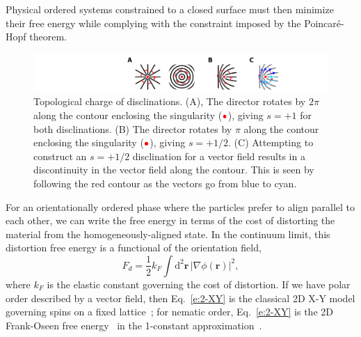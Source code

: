 Physical ordered systems constrained to a closed surface must then minimize their free energy while complying with the constraint imposed by the Poincar\'e-Hopf theorem.
\begin{figure}
  \centering
  \includegraphics{figures/C1/Ch1-Figs_TopCharge.png}
  \caption{Topological charge of disclinations.
  (A), The director rotates by $2\pi$ along the contour enclosing the singularity (${\color{red} \bullet}$), giving $s = +1$ for both disclinations.
  (B) The director rotates by $\pi$ along the contour enclosing the singularity (${\color{red} \bullet}$), giving $s = +1/2$.
  (C) Attempting to construct an $s = +1/2$ disclination for a vector field results in a discontinuity in the vector field along the contour.
  This is seen by following the red contour as the vectors go from blue to cyan.}\label{f:1-TopCharge}
\end{figure}

For an orientationally ordered phase where the particles prefer to align parallel to each other, we can write the free energy in terms of the cost of distorting the material from the homogeneously-aligned state.
In the continuum limit, this distortion free energy is a functional of the orientation field,
\begin{equation}
  F_d = \frac{1}{2} k_F \int \textrm{d}^2\mathbf{r} \, |\nabla \phi(\mathbf{r})|^2,\label{e:2-XY}
\end{equation}
where $k_F$ is the elastic constant governing the cost of distortion.
If we have polar order described by a vector field, then Eq.~\ref{e:2-XY} is the classical 2D X-Y model governing spins on a fixed lattice~\cite{RN175}; for nematic order, Eq.~\ref{e:2-XY} is the 2D Frank-Oseen free energy~\cite{RN61} in the 1-constant approximation~\cite{RN33}.


